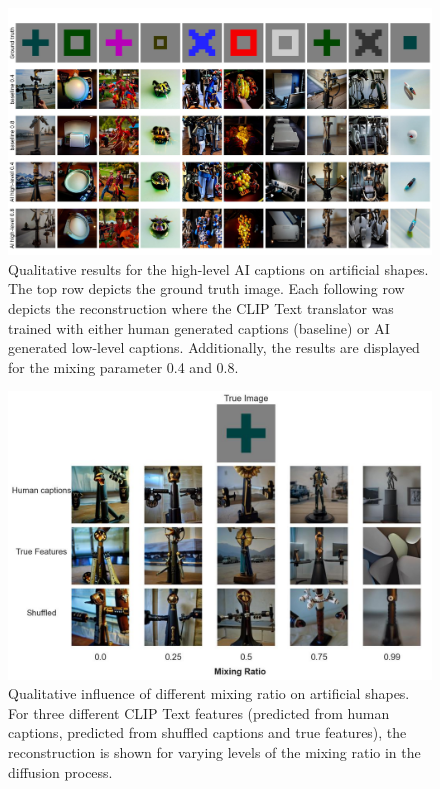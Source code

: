 \begin{figure}[H]
   \centering
   \includegraphics[width=1\textwidth]{plots/aicap_qual_art_highlevel_appendix.JPEG}
   \caption[Experiment 2: Reconstructed images for Brain-Diffuser on artificial shapes with high-level captions]{Qualitative results for the high-level AI captions on artificial shapes. The top row depicts the ground truth image. Each following row depicts the reconstruction where the CLIP Text translator was trained with either human generated captions (baseline) or AI generated low-level captions. Additionally, the results are displayed for the mixing parameter 0.4 and 0.8.}\label{fig:aicap_qual_art_highlevel_appendix}
\end{figure}


\begin{figure}[H]
   \centering
   \includegraphics[width=1\textwidth]{plots/aicap_reconstruction_evolution_art_0.JPEG}
   \caption[Influence of the mixing ratio on artificial shapes]{Qualitative influence of different mixing ratio on artificial shapes. For three different CLIP Text features (predicted from human captions, predicted from shuffled captions and true features), the reconstruction is shown for varying levels of the mixing ratio in the diffusion process.}\label{fig:aicap_reconstruction_evolution_art_0}
\end{figure}

